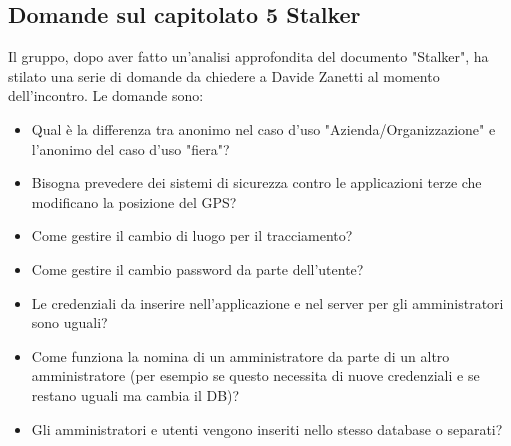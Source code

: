 \subsection{Domande sul capitolato 5 Stalker}
Il gruppo, dopo aver fatto un'analisi approfondita del documento "Stalker", ha stilato una serie di domande da chiedere a Davide Zanetti al momento dell'incontro.
Le domande sono:
\begin{itemize}
	\item Qual è la differenza tra anonimo nel caso d’uso "Azienda/Organizzazione" e l’anonimo del caso d’uso "fiera"?
	\item Bisogna prevedere dei sistemi di sicurezza contro le applicazioni terze che modificano la posizione del GPS?
	\item Come gestire il cambio di luogo per il tracciamento?
	\item Come gestire il cambio password da parte dell’utente?
	\item Le credenziali da inserire nell’applicazione e nel server per gli amministratori sono uguali?
	\item Come funziona la nomina di un amministratore da parte di un altro amministratore (per esempio se questo necessita di nuove credenziali e se restano uguali ma cambia il DB)?
	\item Gli amministratori e utenti vengono inseriti nello stesso database o separati?
\end{itemize}



\clearpage
